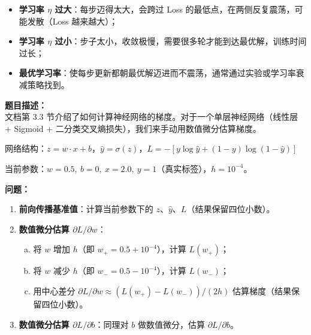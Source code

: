 \documentclass[a4paper,11pt]{ctexart}
\begin{document}
\begin{solutionbox}[参考答案与详细解析]
    \begin{itemize}
        \item \textbf{学习率 $\eta$ 过大}：每步迈得太大，会跨过 Loss 的最低点，在两侧反复震荡，可能发散（Loss 越来越大）；
        \item \textbf{学习率 $\eta$ 过小}：步子太小，收敛极慢，需要很多轮才能到达最优解，训练时间过长；
        \item \textbf{最优学习率}：使每步更新都朝最优解迈进而不震荡，通常通过实验或学习率衰减策略找到。
    \end{itemize}
\end{solutionbox}


\begin{problembox}
    \textbf{题目描述：}\\
    文档第 3.3 节介绍了如何计算神经网络的梯度。对于一个单层神经网络（线性层 + Sigmoid + 二分类交叉熵损失），我们来手动用数值微分估算梯度。

    \vspace{0.3cm}
    网络结构：$z = w \cdot x + b$，$\hat{y} = \sigma(z)$，$L = -[y\log\hat{y} + (1-y)\log(1-\hat{y})]$

    当前参数：$w = 0.5,\ b = 0,\ x = 2.0,\ y = 1$（真实标签），$h = 10^{-4}$。

    \vspace{0.3cm}
    \textbf{问题：}
    \begin{enumerate}[(1)]
        \item \textbf{前向传播基准值}：计算当前参数下的 $z$、$\hat{y}$、$L$（结果保留四位小数）。

        \item \textbf{数值微分估算 $\partial L / \partial w$}：
        \begin{enumerate}[a.]
            \item 将 $w$ 增加 $h$（即 $w_+ = 0.5 + 10^{-4}$），计算 $L(w_+)$；
            \item 将 $w$ 减少 $h$（即 $w_- = 0.5 - 10^{-4}$），计算 $L(w_-)$；
            \item 用中心差分 $\partial L/\partial w \approx (L(w_+)-L(w_-))/(2h)$ 估算梯度（结果保留四位小数）。
        \end{enumerate}

        \item \textbf{数值微分估算 $\partial L / \partial b$}：同理对 $b$ 做数值微分，估算 $\partial L / \partial b$。


\end{enumerate}
\end{problembox}
\end{document}
